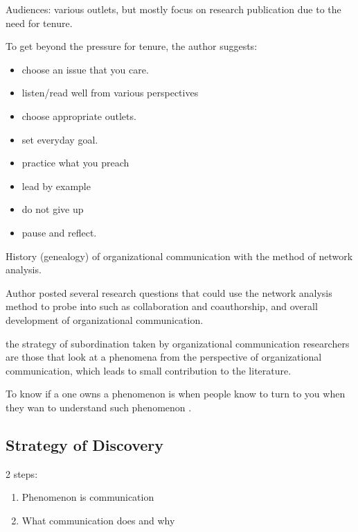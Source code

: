 \documentclass[
]{book}
\providecommand{\tightlist}{%
  \setlength{\itemsep}{0pt}\setlength{\parskip}{0pt}}
\begin{document}
Audiences: various outlets, but mostly focus on research publication due to the need for tenure.

To get beyond the pressure for tenure, the author suggests:

\begin{itemize}
\tightlist
\item
  choose an issue that you care.\\
\item
  listen/read well from various perspectives\\
\item
  choose appropriate outlets.\\
\item
  set everyday goal.\\
\item
  practice what you preach\\
\item
  lead by example\\
\item
  do not give up\\
\item
  pause and reflect.
\end{itemize}

\citep{DUrso_2014}

History (genealogy) of organizational communication with the method of network analysis.

Author posted several research questions that could use the network analysis method to probe into such as collaboration and coauthorship, and overall development of organizational communication.

\citep{Leonardi_2016}

the strategy of subordination taken by organizational communication researchers are those that look at a phenomena from the perspective of organizational communication, which leads to small contribution to the literature.

To know if a one owns a phenomenon is when people know to turn to you when they wan to understand such phenomenon .

\hypertarget{strategy-of-discovery}{%
\subsection{Strategy of Discovery}\label{strategy-of-discovery}}

2 steps:

\begin{enumerate}
\def\labelenumi{\arabic{enumi}.}
\tightlist
\item
  Phenomenon is communication\\
\item
  What communication does and why
\end{enumerate}
\end{document}
